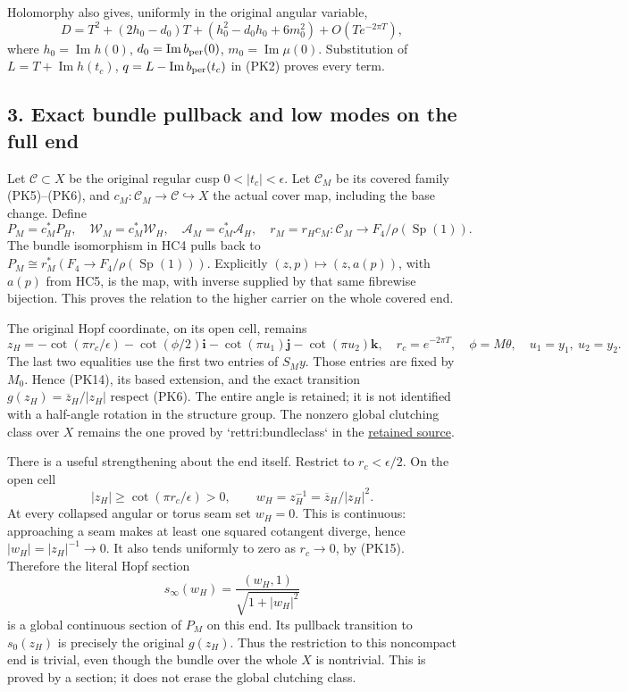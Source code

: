 \documentclass[11pt]{article}
\begin{document}
Holomorphy also gives, uniformly in the original angular variable,
\[
 D=T^2+(2h_0-d_0)T+(h_0^2-d_0h_0+6m_0^2)
       +O(Te^{-2\pi T}),
 \tag{PK12}
\]
where \(h_0=\operatorname{Im}h(0)\),
\(d_0=\operatorname{Im}b_{\rm per}(0)\),
\(m_0=\operatorname{Im}\mu(0)\). Substitution of
\(L=T+\operatorname{Im}h(t_c)\), \(q=L-\operatorname{Im}b_{\rm per}(t_c)\)
in (PK2) proves every term.

\subsection*{3. Exact bundle pullback and low modes on the full end}

Let \(\mathcal C\subset X\) be the original regular cusp
\(0<|t_c|<\epsilon\). Let \(\mathcal C_M\) be its covered family (PK5)–(PK6),
and \(c_M:\mathcal C_M\to\mathcal C\hookrightarrow X\) the actual
cover map, including the base change. Define
\[
 P_M=c_M^*P_H,\quad \mathcal W_M=c_M^*\mathcal W_H,\quad
 \mathcal A_M=c_M^*\mathcal A_H,\quad
 r_M=r_Hc_M:\mathcal C_M\to F_4/\rho(\operatorname{Sp}(1)).
 \tag{PK13}
\]
The bundle isomorphism in HC4 pulls back to
\(P_M\cong r_M^*(F_4\to F_4/\rho(\operatorname{Sp}(1)))\).
Explicitly \((z,p)\mapsto(z,a(p))\), with \(a(p)\) from HC5, is the
map, with inverse supplied by that same fibrewise bijection. This proves
the relation to the higher carrier on the whole covered end.

The original Hopf coordinate, on its open cell, remains
\[
 z_H=-\cot(\pi r_c/\epsilon)-\cot(\phi/2)\mathbf i
       -\cot(\pi u_1)\mathbf j-\cot(\pi u_2)\mathbf k,
 \quad r_c=e^{-2\pi T},\quad \phi=M\theta,
 \quad u_1=y_1,\ u_2=y_2.
 \tag{PK14}
\]
The last two equalities use the first two entries of \(S_My\).
Those entries are fixed by \(M_0\). Hence (PK14), its based extension,
and the exact transition \(g(z_H)=\overline z_H/|z_H|\) respect (PK6).
The entire angle is retained; it is not identified with a half-angle
rotation in the structure group. The nonzero global clutching class over
\(X\) remains the one proved by `rettri:bundleclass` in the
\href{https://github.com/KokunoYumeto/yang-mills-interacting-workbench/blob/7d5681ed53835433a5fb72d880b6292832f2efbf/yang-mills/continuations/20260930-s6-ns-moment-map-bridge/sources/higher_rung/s6_higher_rung_24d_preprint.tex#L5281}{retained source}.

There is a useful strengthening about the end itself. Restrict to
\(r_c<\epsilon/2\). On the open cell
\[
 |z_H|\ge\cot(\pi r_c/\epsilon)>0,\qquad
 w_H=z_H^{-1}=\overline z_H/|z_H|^2.
 \tag{PK15}
\]
At every collapsed angular or torus seam set \(w_H=0\). This is
continuous: approaching a seam makes at least one squared cotangent
diverge, hence \(|w_H|=|z_H|^{-1}\to0\). It also tends uniformly to zero
as \(r_c\to0\), by (PK15). Therefore the literal Hopf section
\[
 s_\infty(w_H)=\frac{(w_H,1)}{\sqrt{1+|w_H|^2}}
 \tag{PK16}
\]
is a global continuous section of \(P_M\) on this end. Its pullback
transition to \(s_0(z_H)\) is precisely the original \(g(z_H)\).
Thus the restriction to this noncompact end is trivial, even though the
bundle over the whole \(X\) is nontrivial. This is proved by a section;
it does not erase the global clutching class.
\end{document}
